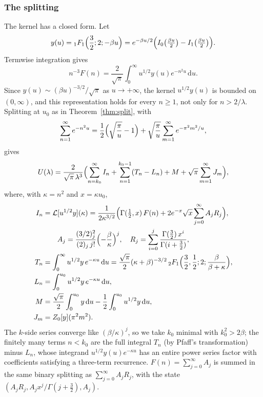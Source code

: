 \documentclass[11pt,reqno]{amsart}
\theoremstyle{definition}
\theoremstyle{remark}
\newcommand{\dd}{\,\mathrm{d}}
\begin{document}
\subsubsection{The splitting}
The kernel has a closed form. Let
\[
  y(u) = {}_1F_1\Bigl(\frac32; 2; -\beta u\Bigr) = e^{-\beta u/2}\Bigl(I_0\bigl(\tfrac{\beta u}{2}\bigr) - I_1\bigl(\tfrac{\beta u}2\bigr)\Bigr).
\]
Termwise integration gives
\[
  n^{-3}F(n) = \frac{2}{\sqrt\pi}\int_0^\infty u^{1/2}y(u)e^{-n^2u}\dd u.
\]
Since
$y(u) \sim (\beta u)^{-3/2}/\sqrt\pi$ as $u \to +\infty$, the kernel $u^{1/2}y(u)$ is bounded on $(0,\infty)$, and this
representation holds for every $n \ge 1$, not only for $n > 2/\lambda$. Splitting at $u_0$ as in
Theorem~\ref{thm:split}, with
\[
  \sum_{n=1}^{\infty}e^{-n^2u} = \frac12\Bigl(\sqrt{\frac\pi u} - 1\Bigr) + \sqrt{\frac\pi u}\sum_{m=1}^{\infty}e^{-\pi^2m^2/u},
\]
gives
\[
  U(\lambda) = \frac{2}{\sqrt\pi\,\lambda^3}\Bigl(\sum_{n=k_0}^{\infty}I_n + \sum_{n=1}^{k_0-1}(T_n - L_n) + M + \sqrt\pi\sum_{m=1}^{\infty}J_m\Bigr),
\]
where, with $\kappa = n^2$ and $x = \kappa u_0$,
\begin{align*}
  I_n &= \mathcal L[u^{1/2}y](\kappa)
       = \frac{1}{2\kappa^{3/2}}\Bigl(\Gamma(\tfrac12, x)\,F(n)
         + 2e^{-x}\sqrt x\sum_{j=0}^{\infty}A_jR_j\Bigr), \\
  &\qquad A_j = \frac{(3/2)_j^2}{(2)_j\,j!}\Bigl(-\frac\beta \kappa\Bigr)^j, \quad R_j = \sum_{i=0}^{j}\frac{\Gamma(\frac32)\,x^i}{\Gamma(i+\frac32)}, \\
  T_n &= \int_0^\infty u^{1/2}y\,e^{-\kappa u}\dd u = \frac{\sqrt\pi}{2}(\kappa+\beta)^{-3/2}\,{}_2F_1\Bigl(\frac32,\frac12;2;\frac{\beta}{\beta+\kappa}\Bigr), \\
  L_n &= \int_0^{u_0}u^{1/2}y\,e^{-\kappa u}\dd u, \\
  M &= \frac{\sqrt\pi}2\int_0^{u_0}y\dd u - \frac12\int_0^{u_0}u^{1/2}y\dd u, \\
  J_m &= Z_0[y](\pi^2m^2) .
\end{align*}
The $k$-side series converge like $(\beta/\kappa)^j$, so we take $k_0$ minimal with $k_0^2 > 2\beta$; the finitely many terms
$n < k_0$ are the full integral $T_n$ (by Pfaff's transformation) minus $L_n$, whose integrand $u^{1/2}y(u)e^{-\kappa u}$ has an
entire power series factor with coefficients satisfying a three-term recurrence. $F(n) = \sum_{j=0}^{\infty}A_j$ is summed in the
same binary splitting as $\sum_{j=0}^{\infty}A_jR_j$, with the state $(A_jR_j, A_jx^j/\Gamma(j+\frac32), A_j)$.
\end{document}
